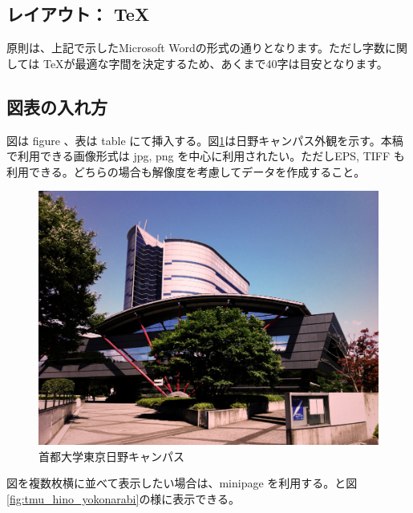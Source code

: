 \documentclass[a4paper]{jsarticle}
\begin{document}
\subsection{レイアウト： \TeX}
原則は、上記で示したMicrosoft Wordの形式の通りとなります。ただし字数に関しては \TeX が最適な字間を決定するため、あくまで40字は目安となります。

\subsection{図表の入れ方}
図は figure 、表は table にて挿入する。図\ref{fig:tmu_hino}は日野キャンパス外観を示す。本稿で利用できる画像形式は jpg, png を中心に利用されたい。ただしEPS, TIFF も利用できる。どちらの場合も解像度を考慮してデータを作成すること。
\begin{figure}[tb]
  \begin{center}
    \includegraphics[width=0.95\hsize]{./images/sample.jpg}
    \caption{首都大学東京日野キャンパス}
    \label{fig:tmu_hino}
  \end{center}
\end{figure}

図を複数枚横に並べて表示したい場合は、minipage を利用する。と図\ref{fig:tmu_hino_yokonarabi}の様に表示できる。
\end{document}
